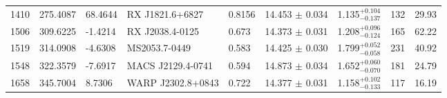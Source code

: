 \documentclass[apj,twocolumn]{emulateapj}
\begin{document}
{\begin{table} [h!]
\begin{tabular}{l l l l l c c c c}
  1410 &  275.4087 & 68.4644  & RX J1821.6+6827     & 0.8156 & 14.453 $\pm$  0.034  &     1.135$^{+0.104}_{-0.137}$  &       132 & 29.93 \\
  1506 &  309.6225 & -1.4214  & RX J2038.4-0125     & 0.673  & 14.373 $\pm$  0.031  &     1.208$^{+0.096}_{-0.124}$  &       165 & 62.22 \\ 
  1519 &  314.0908 & -4.6308  & MS2053.7-0449       & 0.583  & 14.425 $\pm$  0.030  &     1.799$^{+0.052}_{-0.058}$  &       231 & 40.92 \\
  1548 &  322.3579 & -7.6917  & MACS J2129.4-0741   & 0.594  & 14.873 $\pm$  0.034  &     1.652$^{+0.060}_{-0.070}$  &       181 & 24.79 \\
  1658 &  345.7004 & 8.7306   & WARP J2302.8+0843   & 0.722  & 14.377 $\pm$  0.031  &     1.158$^{+0.102}_{-0.133}$  &       117 & 16.19 \\\hline
\end{tabular}
\end{table}

\clearpage

}
\end{document}
